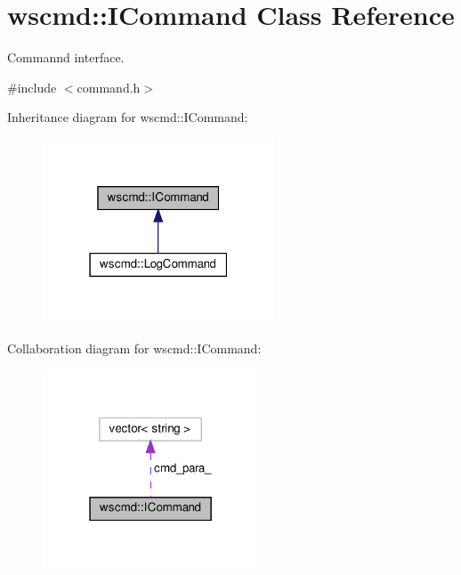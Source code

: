 \hypertarget{classwscmd_1_1ICommand}{}\section{wscmd\+:\+:I\+Command Class Reference}
\label{classwscmd_1_1ICommand}


Commannd interface.  




{\ttfamily \#include $<$command.\+h$>$}



Inheritance diagram for wscmd\+:\+:I\+Command\+:\nopagebreak
\begin{figure}[H]
\begin{center}
\leavevmode
\includegraphics[width=195pt]{classwscmd_1_1ICommand__inherit__graph}
\end{center}
\end{figure}


Collaboration diagram for wscmd\+:\+:I\+Command\+:\nopagebreak
\begin{figure}[H]
\begin{center}
\leavevmode
\includegraphics[width=183pt]{classwscmd_1_1ICommand__coll__graph}
\end{center}
\end{figure}
